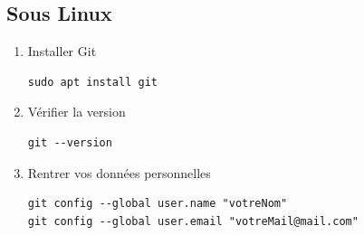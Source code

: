 \documentclass[french, 12pt]{article}%
\begin{document}
\subsection{Sous Linux}
\begin{enumerate}
\item Installer Git

\begin{lstlisting}[style=commande]
sudo apt install git 
\end{lstlisting}



\item Vérifier la version 

\begin{lstlisting}[style=commande]
git --version 
\end{lstlisting}


\item Rentrer vos données personnelles 

\begin{lstlisting}[style=commande]
git config --global user.name "votreNom"
git config --global user.email "votreMail@mail.com"
\end{lstlisting}


\end{enumerate}
\end{document}
